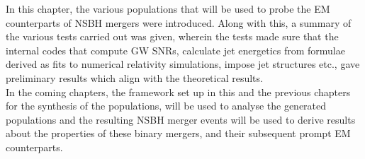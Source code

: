     In this chapter, the various populations that will be used to probe the EM
    counterparts of NSBH mergers were introduced. Along with this, a summary of the
    various tests carried out was given, wherein the tests made sure that the internal
    codes that compute GW SNRs, calculate jet energetics from formulae derived as fits
    to numerical relativity simulations, impose jet structures etc., gave preliminary
    results which align with the theoretical results.\\
    In the coming chapters, the framework set up in this and the previous chapters for
    the synthesis of the populations, will be used to analyse the generated populations
    and the resulting NSBH merger events will be used to derive results about the
    properties of these binary mergers, and their subsequent prompt EM counterparts.
